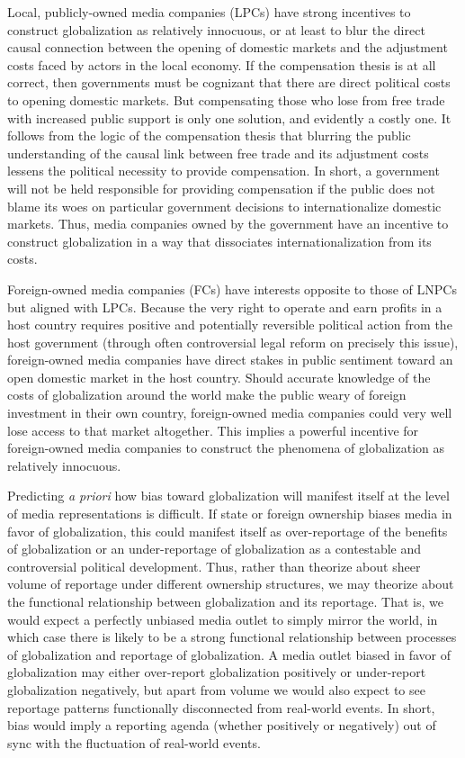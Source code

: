 \documentclass[12pt]{report}
\begin{document}
Local, publicly-owned media companies (LPCs) have strong incentives to construct globalization as relatively innocuous, or at least to blur the direct causal connection between the opening of domestic markets and the adjustment costs faced by actors in the local economy. If the compensation thesis is at all correct, then governments must be cognizant that there are direct political costs to opening domestic markets. But compensating those who lose from free trade with increased public support is only one solution, and evidently a costly one. It follows from the logic of the compensation thesis that blurring the public understanding of the causal link between free trade and its adjustment costs lessens the political necessity to provide compensation. In short, a government will not be held responsible for providing compensation if the public does not blame its woes on particular government decisions to internationalize domestic markets. Thus, media companies owned by the government have an incentive to construct globalization in a way that dissociates internationalization from its costs.

Foreign-owned media companies (FCs) have interests opposite to those of LNPCs but aligned with LPCs. Because the very right to operate and earn profits in a host country requires positive and potentially reversible political action from the host government (through often controversial legal reform on precisely this issue), foreign-owned media companies have direct stakes in public sentiment toward an open domestic market in the host country. Should accurate knowledge of the costs of globalization around the world make the public weary of foreign investment in their own country, foreign-owned media companies could very well lose access to that market altogether. This implies a powerful incentive for foreign-owned media companies to construct the phenomena of globalization as relatively innocuous. 

Predicting \emph{a priori} how bias toward globalization will manifest itself at the level of media representations is difficult. If state or foreign ownership biases media in favor of globalization, this could manifest itself as over-reportage of the benefits of globalization or an under-reportage of globalization as a contestable and controversial political development. Thus, rather than theorize about sheer volume of reportage under different ownership structures, we may theorize about the functional relationship between globalization and its reportage. That is, we would expect a perfectly unbiased media outlet to simply mirror the world, in which case there is likely to be a strong functional relationship between processes of globalization and reportage of globalization. A media outlet biased in favor of globalization may either over-report globalization positively or under-report globalization negatively, but apart from volume we would also expect to see reportage patterns functionally disconnected from real-world events. In short, bias would imply a reporting agenda (whether positively or negatively) out of sync with the fluctuation of real-world events.
\end{document}
